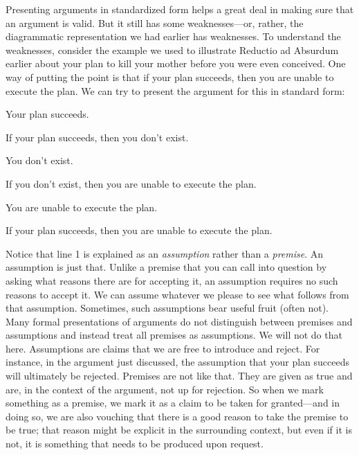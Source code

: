 Presenting arguments in standardized form helps a great deal in making sure that 
an argument is valid. But it still has some weaknesses---or, rather, the 
diagrammatic representation we had earlier has weaknesses. To understand the 
weaknesses, consider the example we used to illustrate Reductio ad Absurdum 
earlier about your plan to kill your mother before you were even conceived. One 
way of putting the point is that if your plan succeeds, then you are unable to 
execute the plan.  We can try to present the argument for this in standard form:

\begin{argument*}

 \aitem Your plan succeeds. 

 \aitem If your plan succeeds, then you don't exist. 

 \aitem You don't exist. 

 \aitem If you don't exist, then you are unable to execute the 
 plan.

 \aitem You are unable to execute the plan.
 
 \aitem If your plan succeeds, then you are unable to execute the plan.

\end{argument*}


Notice that line 1 is explained as an \emph{assumption} rather than a 
\emph{premise}.  An assumption is just that. Unlike a premise that you can call 
into question by asking what reasons there are for accepting it, an assumption 
requires no such reasons to accept it. We can assume whatever we please to see 
what follows from that assumption. Sometimes, such assumptions bear useful fruit 
(often not).  Many formal presentations of arguments do not distinguish between 
premises and assumptions and instead treat all premises as assumptions.  We will 
not do that here. Assumptions are claims that we are free to introduce and 
reject. For instance, in the argument just discussed, the assumption that your 
plan succeeds will ultimately be rejected. Premises are not like that.  They are 
given as true and are, in the context of the argument, not up for rejection. So 
when we mark something as a premise, we mark it as a claim to be taken for 
granted---and in doing so, we are also vouching that there is a good reason to  
take the premise to be true; that reason might be explicit in the surrounding 
context, but even if it is not, it is something that needs to be produced upon 
request.

